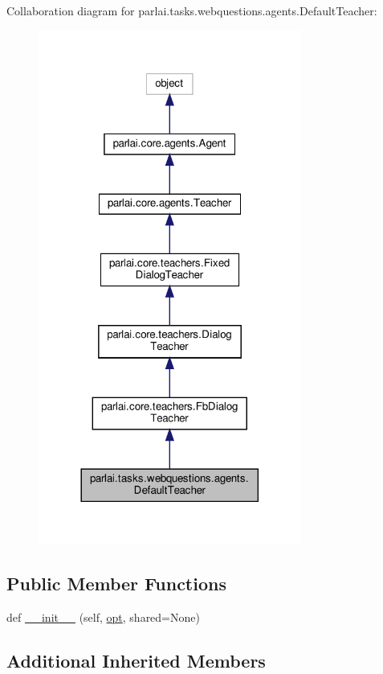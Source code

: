 Collaboration diagram for parlai.\+tasks.\+webquestions.\+agents.\+Default\+Teacher\+:
\nopagebreak
\begin{figure}[H]
\begin{center}
\leavevmode
\includegraphics[width=245pt]{classparlai_1_1tasks_1_1webquestions_1_1agents_1_1DefaultTeacher__coll__graph}
\end{center}
\end{figure}
\subsection*{Public Member Functions}
\begin{DoxyCompactItemize}
\item 
def \hyperlink{classparlai_1_1tasks_1_1webquestions_1_1agents_1_1DefaultTeacher_a5206081c0932010aa0cb6ac15eb51ed1}{\+\_\+\+\_\+init\+\_\+\+\_\+} (self, \hyperlink{classparlai_1_1core_1_1teachers_1_1FbDialogTeacher_af7a9ec497b9cd0292d7b8fa220da7c28}{opt}, shared=None)
\end{DoxyCompactItemize}
\subsection*{Additional Inherited Members}


